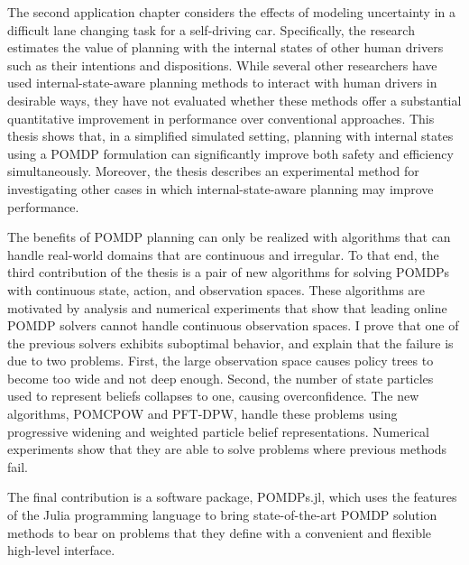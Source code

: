 \documentclass[12pt]{report}
\begin{document}
The second application chapter considers the effects of modeling uncertainty in a difficult lane changing task for a self-driving car.
Specifically, the research estimates the value of planning with the internal states of other human drivers such as their intentions and dispositions.
While several other researchers have used internal-state-aware planning methods to interact with human drivers in desirable ways, they have not evaluated whether these methods offer a substantial quantitative improvement in performance over conventional approaches.
This thesis shows that, in a simplified simulated setting, planning with internal states using a POMDP formulation can significantly improve both safety and efficiency simultaneously.
Moreover, the thesis describes an experimental method for investigating other cases in which internal-state-aware planning may improve performance.

The benefits of POMDP planning can only be realized with algorithms that can handle real-world domains that are continuous and irregular.
To that end, the third contribution of the thesis is a pair of new algorithms for solving POMDPs with continuous state, action, and observation spaces.
These algorithms are motivated by analysis and numerical experiments that show that leading online POMDP solvers cannot handle continuous observation spaces.
I prove that one of the previous solvers exhibits suboptimal behavior, and explain that the failure is due to two problems.
First, the large observation space causes policy trees to become too wide and not deep enough.
Second, the number of state particles used to represent beliefs collapses to one, causing overconfidence.
The new algorithms, POMCPOW and PFT-DPW, handle these problems using progressive widening and weighted particle belief representations.
Numerical experiments show that they are able to solve problems where previous methods fail.

The final contribution is a software package, POMDPs.jl, which uses the features of the Julia programming language to bring state-of-the-art POMDP solution methods to bear on problems that they define with a convenient and flexible high-level interface.

\end{document}
